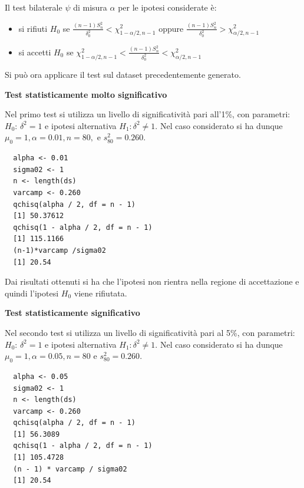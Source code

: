Il test bilaterale $\psi$ di misura $\alpha$ per le ipotesi considerate è:

\begin{itemize}
    \item si rifiuti $H_0$ se $\frac{(n-1)S_n^2}{\delta_0^2} < \chi_{1-\alpha/2,n-1}^2$ oppure $\frac{(n-1)S_n^2}{\delta_0^2} > \chi_{\alpha/2,n-1}^2$
    \item si accetti $H_0$ se $\chi_{1-\alpha/2,n-1}^2 < \frac{(n-1)S_n^2}{\delta_0^2} < \chi_{\alpha/2,n-1}^2$
\end{itemize}

Si può ora applicare il test sul dataset precedentemente generato.

\vspace{5mm}
\noindent \textbf{Test statisticamente molto significativo}

Nel primo test si utilizza un livello di significatività pari all'1\%, con parametri: $H_0$: $\delta^2 = 1$ e ipotesi alternativa $H_1: \delta^2 \neq 1$. Nel caso considerato si ha dunque $\mu_0 = 1, \alpha = 0.01, n = 80,$ e $s_{80}^2 = 0.260$.

\vspace{5mm}
\begin{lstlisting}
  alpha <- 0.01
  sigma02 <- 1
  n <- length(ds)
  varcamp <- 0.260
  qchisq(alpha / 2, df = n - 1)
  [1] 50.37612
  qchisq(1 - alpha / 2, df = n - 1)
  [1] 115.1166
  (n-1)*varcamp /sigma02
  [1] 20.54
\end{lstlisting}

Dai risultati ottenuti si ha che l'ipotesi non rientra nella regione di accettazione e quindi l'ipotesi $H_0$ viene rifiutata.

\vspace{5mm}
\noindent \textbf{Test statisticamente significativo}

Nel secondo test si utilizza un livello di significatività pari al 5\%, con parametri: $H_0$: $\delta^2 = 1$ e ipotesi alternativa $H_1: \delta^2 \neq 1$. Nel caso considerato si ha dunque $\mu_0 = 1, \alpha = 0.05, n = 80$ e $s_{80}^2 = 0.260$.

\vspace{5mm}
\begin{lstlisting}
  alpha <- 0.05
  sigma02 <- 1
  n <- length(ds)
  varcamp <- 0.260
  qchisq(alpha / 2, df = n - 1)
  [1] 56.3089
  qchisq(1 - alpha / 2, df = n - 1)
  [1] 105.4728
  (n - 1) * varcamp / sigma02
  [1] 20.54
  
\end{lstlisting}

